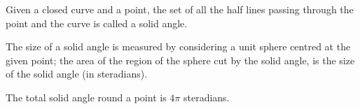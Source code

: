 Given a closed curve and a point, the set of all the half lines passing through
the point and the curve is called a solid angle.
\par
The size of a solid angle is measured by considering a unit sphere centred at 
the given point; the area of the region of the sphere cut by the solid angle, is
the size of the solid angle (in steradians).
\par
The total solid angle round a point is $ 4 \pi $ steradians.